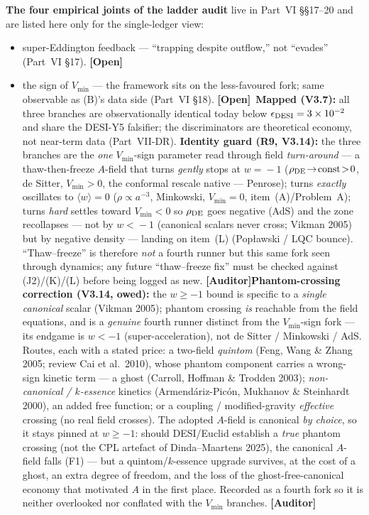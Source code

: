 \documentclass[11pt]{article}
\newcommand{\Auditor}{\textbf{\textcolor{teal!55!black}{[Auditor]}}}
\newcommand{\open}{\textcolor{red!70!black}{\textbf{[Open]}}}
\begin{document}
\textbf{The four empirical joints of the ladder audit} live in Part~VI \S\S17--20 and are listed here only for the single-ledger view:
\begin{itemize}[leftmargin=2.9em,itemsep=2pt]
\item[\textbf{(J1)}] super-Eddington feedback --- ``trapping despite outflow,'' not ``evades'' (Part~VI \S17). \open
\item[\textbf{(J2)}] the sign of $V_{\min}$ --- the framework sits on the less-favoured fork; same observable as (B)'s data side (Part~VI \S18). \open\ \textbf{Mapped (V3.7):} all three branches are observationally identical today below $\epsilon_{\rm DESI}=3\times10^{-2}$ and share the DESI-Y5 falsifier; the discriminators are theoretical economy, not near-term data (Part~VII-DR). \textbf{Identity guard (R9, V3.14):} the three branches are the \emph{one} $V_{\min}$-sign parameter read through field \emph{turn-around} --- a thaw-then-freeze $A$-field that turns \emph{gently} stops at $w\!=\!-1$ ($\rho_{\rm DE}\!\to\!{\rm const}\!>\!0$, de Sitter, $V_{\min}\!>\!0$, the conformal rescale native --- Penrose); turns \emph{exactly} oscillates to $\langle w\rangle\!=\!0$ ($\rho\!\propto\!a^{-3}$, Minkowski, $V_{\min}\!=\!0$, item~(A)/Problem~A); turns \emph{hard} settles toward $V_{\min}\!<\!0$ so $\rho_{\rm DE}$ goes negative (AdS) and the zone recollapses --- not by $w\!<\!-1$ (canonical scalars never cross; Vikman 2005) but by negative density --- landing on item~(L) (Pop\l awski / LQC bounce). ``Thaw--freeze'' is therefore \emph{not} a fourth runner but this same fork seen through dynamics; any future ``thaw--freeze fix'' must be checked against (J2)/(K)/(L) before being logged as new. \Auditor \textbf{Phantom-crossing correction (V3.14, owed):} the $w\ge-1$ bound is specific to a \emph{single canonical} scalar (Vikman 2005); phantom crossing \emph{is} reachable from the field equations, and is a \emph{genuine} fourth runner distinct from the $V_{\min}$-sign fork --- its endgame is $w<-1$ (super-acceleration), not de Sitter / Minkowski / AdS. Routes, each with a stated price: a two-field \emph{quintom} (Feng, Wang \& Zhang 2005; review Cai et al.\ 2010), whose phantom component carries a wrong-sign kinetic term --- a ghost (Carroll, Hoffman \& Trodden 2003); \emph{non-canonical / $k$-essence} kinetics (Armend\'ariz-Pic\'on, Mukhanov \& Steinhardt 2000), an added free function; or a coupling / modified-gravity \emph{effective} crossing (no real field crosses). The adopted $A$-field is canonical \emph{by choice}, so it stays pinned at $w\ge-1$: should DESI/Euclid establish a \emph{true} phantom crossing (not the CPL artefact of Dinda--Maartens 2025), the canonical $A$-field falls (F1) --- but a quintom/$k$-essence upgrade survives, at the cost of a ghost, an extra degree of freedom, and the loss of the ghost-free-canonical economy that motivated $A$ in the first place. Recorded as a fourth fork so it is neither overlooked nor conflated with the $V_{\min}$ branches. \Auditor

\end{itemize}
\end{document}
